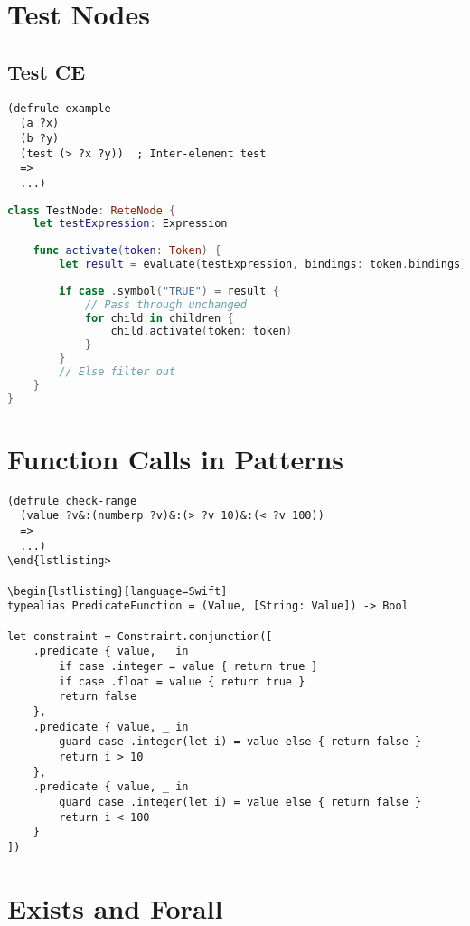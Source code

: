 \section{Test Nodes}

\subsection{Test CE}

\begin{lstlisting}[language=CLIPS]
(defrule example
  (a ?x)
  (b ?y)
  (test (> ?x ?y))  ; Inter-element test
  =>
  ...)
\end{lstlisting}

\begin{lstlisting}[language=Swift]
class TestNode: ReteNode {
    let testExpression: Expression
    
    func activate(token: Token) {
        let result = evaluate(testExpression, bindings: token.bindings)
        
        if case .symbol("TRUE") = result {
            // Pass through unchanged
            for child in children {
                child.activate(token: token)
            }
        }
        // Else filter out
    }
}
\end{lstlisting}

\section{Function Calls in Patterns}

\begin{lstlisting}[language=CLIPS]
(defrule check-range
  (value ?v&:(numberp ?v)&:(> ?v 10)&:(< ?v 100))
  =>
  ...)
\end{lstlisting>

\begin{lstlisting}[language=Swift]
typealias PredicateFunction = (Value, [String: Value]) -> Bool

let constraint = Constraint.conjunction([
    .predicate { value, _ in
        if case .integer = value { return true }
        if case .float = value { return true }
        return false
    },
    .predicate { value, _ in
        guard case .integer(let i) = value else { return false }
        return i > 10
    },
    .predicate { value, _ in
        guard case .integer(let i) = value else { return false }
        return i < 100
    }
])
\end{lstlisting}

\section{Exists and Forall}


